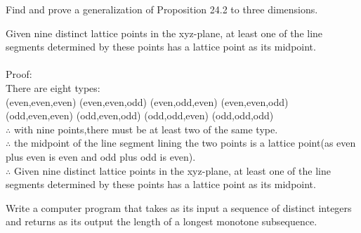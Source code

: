 \documentclass[11pt, a4paper, UTF8]{ctexart}
\begin{document}
\begin{problem}[ES:4.6]
Find and prove a generalization of Proposition 24.2 to three dimensions.
\end{problem}

\begin{solution}
Given nine distinct lattice points in the xyz-plane, at least one of the line segments determined by these points has a lattice point as its midpoint.\\
\\
Proof:\\
There are eight types:\\
(even,even,even)  (even,even,odd)   (even,odd,even)   (even,even,odd)  \\
(odd,even,even)   (odd,even,odd)    (odd,odd,even)    (odd,odd,odd)    \\
$\therefore$ with nine points,there must be at least two of the same type.\\
$\therefore$ the midpoint of the line segment lining the two points is a lattice point(as even plus even is even and odd plus odd is even).\\
$\therefore$ Given nine distinct lattice points in the xyz-plane, at least one of the line segments determined by these points has a lattice point as its midpoint.

\end{solution}


\begin{problem}[ES:4.8]
Write a computer program that takes as its input a sequence of distinct integers and returns as its output the length of a longest monotone subsequence.
\end{problem}
\end{document}
